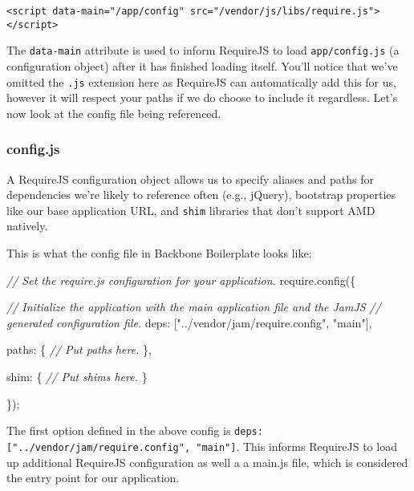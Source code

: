 \documentclass[9pt]{book}
\newenvironment{Shaded}{}{}
\newcommand{\DataTypeTok}[1]{\textcolor[rgb]{0.56,0.13,0.00}{{#1}}}
\newcommand{\StringTok}[1]{\textcolor[rgb]{0.25,0.44,0.63}{{#1}}}
\newcommand{\CommentTok}[1]{\textcolor[rgb]{0.38,0.63,0.69}{\textit{{#1}}}}
\newcommand{\OtherTok}[1]{\textcolor[rgb]{0.00,0.44,0.13}{{#1}}}
\newcommand{\FunctionTok}[1]{\textcolor[rgb]{0.02,0.16,0.49}{{#1}}}
\newcommand{\NormalTok}[1]{{#1}}
\begin{document}
\begin{verbatim}
<script data-main="/app/config" src="/vendor/js/libs/require.js"></script>
\end{verbatim}

The \texttt{data-main} attribute is used to inform RequireJS to load
\texttt{app/config.js} (a configuration object) after it has finished
loading itself. You'll notice that we've omitted the \texttt{.js}
extension here as RequireJS can automatically add this for us, however
it will respect your paths if we do choose to include it regardless.
Let's now look at the config file being referenced.

\subsubsection{config.js}\label{config.js}

A RequireJS configuration object allows us to specify aliases and paths
for dependencies we're likely to reference often (e.g., jQuery),
bootstrap properties like our base application URL, and \texttt{shim}
libraries that don't support AMD natively.

This is what the config file in Backbone Boilerplate looks like:

\begin{Shaded}
\begin{Highlighting}[]
\CommentTok{// Set the require.js configuration for your application.}
\OtherTok{require}\NormalTok{.}\FunctionTok{config}\NormalTok{(\{}

  \CommentTok{// Initialize the application with the main application file and the JamJS}
  \CommentTok{// generated configuration file.}
  \DataTypeTok{deps}\NormalTok{: [}\StringTok{"../vendor/jam/require.config"}\NormalTok{, }\StringTok{"main"}\NormalTok{],}

  \DataTypeTok{paths}\NormalTok{: \{}
    \CommentTok{// Put paths here.}
  \NormalTok{\},}

  \DataTypeTok{shim}\NormalTok{: \{}
    \CommentTok{// Put shims here.}
  \NormalTok{\}}

\NormalTok{\});}
\end{Highlighting}
\end{Shaded}

The first option defined in the above config is
\texttt{deps: {[}"../vendor/jam/require.config", "main"{]}}. This
informs RequireJS to load up additional RequireJS configuration as well
a a main.js file, which is considered the entry point for our
application.
\end{document}
